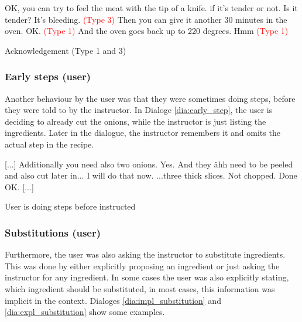 \documentclass[
	11pt, %
]{fphw}
\newenvironment{captionedDialogue}
    {\captionsetup{
        type=Dialogue,
        skip=2pt,
        belowskip=13pt
        }
    }
    {}
\newenvironment{mydialogue}
    {\begin{snugshade}
     \hrulefill
     \begin{dialogue}}
    {\end{dialogue}
     \hrulefill
     \end{snugshade}}
\begin{document}
\begin{captionedDialogue}
    \begin{mydialogue}
         OK, you can try to feel the meat with the tip of a knife. if it's tender or not. Is it tender?
         It's bleeding. \textcolor{red}{(Type 3)}
         Then you can give it another 30 minutes in the oven. 
         OK. \textcolor{red}{(Type 1)}
         And the oven goes back up to 220 degrees. 
         Hmm \textcolor{red}{(Type 1)}
    \end{mydialogue}
    \caption{Acknowledgement (Type 1 and 3)}
    \label{dia:ack2}
\end{captionedDialogue}

\subsubsection*{Early steps (user)}
Another behaviour by the user was that they were sometimes doing steps, before they were told to by the instructor. In Dialoge \ref{dia:early_step}, the user is deciding to already cut the onions, while the instructor is just listing the ingredients. Later in the dialogue, the instructor remembers it and omits the actual step in the recipe.

\begin{captionedDialogue}
    \begin{mydialogue}
         [...] Additionally you need also two onions. 
         Yes.
         And they ähh need to be peeled and also cut later in...
         I will do that now.
         ...three thick slices. Not chopped.
         Done
         OK. [...]
    \end{mydialogue}
    \caption{User is doing steps before instructed}
    \label{dia:early_step}
\end{captionedDialogue}

\subsubsection*{Substitutions (user)}
Furthermore, the user was also asking the instructor to substitute ingredients. This was done by either explicitly proposing an ingredient or just asking the instructor for any ingredient. In some cases the user was also explicitly stating, which ingredient should be substituted, in most cases, this information was implicit in the context. Dialoges \ref{dia:impl_substitution} and \ref{dia:expl_substitution} show some examples.
\end{document}
